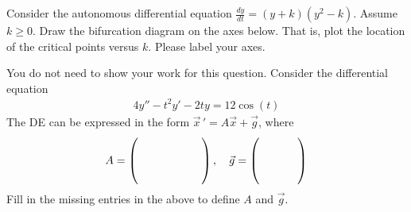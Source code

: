 \ifnum {}
\question[2] Consider the autonomous differential equation $\displaystyle \frac{dy}{dt}= (y+k)(y^2-k)$.  Assume $k\ge0$. Draw the bifurcation diagram on the axes below. That is, plot the location of the critical points versus $k$. Please label your axes.
        \begin{center}
        \end{center}
\fi

\ifnum {}
    \question[2] You do not need to show your work for this question. Consider the differential equation 
    \begin{align*}
        4y'' - t^2y' - 2ty = 12\cos(t)
    \end{align*}
    The DE can be expressed in the form $\vec x\, ' = A\vec x + \vec g$, where 
    \begin{align*}
     A = \left( \hbox to 2cm{\vbox to 0.85cm{}} \right), \quad \vec g = \left( \hbox to 1.2cm{\vbox to 0.85cm{}} \right)
    \end{align*}
    Fill in the missing entries in the above to define $A$ and $\vec g$. 
\fi





